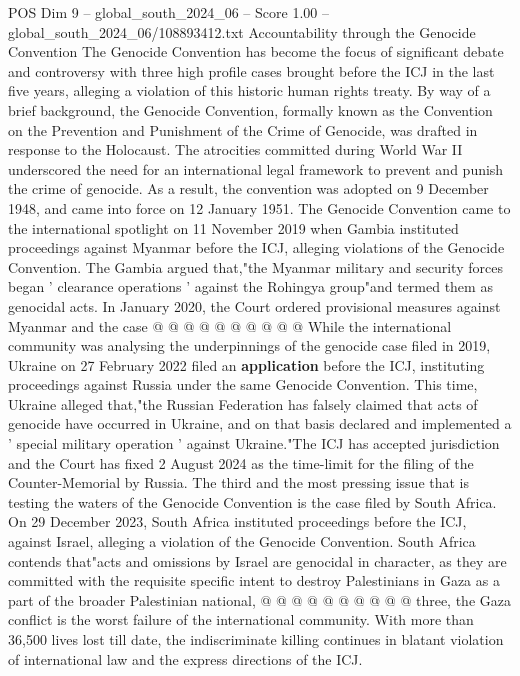\begin{textsample}{POS Dim 9 – global\_south\_2024\_06 – Score 1.00 – global\_south\_2024\_06/108893412.txt}  \label{ex:f9_pos_090}
Accountability through the Genocide Convention The Genocide Convention has become the focus of significant debate and controversy with three high profile cases brought before the ICJ in the last five years, alleging a violation of this historic human rights treaty.
By way of a brief background, the Genocide Convention, formally known as the Convention on the Prevention and Punishment of the Crime of Genocide, was drafted in response to the Holocaust.
The atrocities committed during World War II underscored the need for an international legal framework to prevent and punish the crime of genocide.
As a result, the convention was adopted on 9 December 1948, and came into force on 12 January 1951.
The Genocide Convention came to the international spotlight on 11 November 2019 when Gambia instituted proceedings against Myanmar before the ICJ, alleging violations of the Genocide Convention.
The Gambia argued that,"the Myanmar military and security forces began ' clearance operations ' against the Rohingya group"and termed them as genocidal acts.
In January 2020, the Court ordered provisional measures against Myanmar and the case @ @ @ @ @ @ @ @ @ @ While the international community was analysing the underpinnings of the genocide case filed in 2019, Ukraine on 27 February 2022 filed an \textbf{application} before the ICJ, instituting proceedings against Russia under the same Genocide Convention.
This time, Ukraine alleged that,"the Russian Federation has falsely claimed that acts of genocide have occurred in Ukraine, and on that basis declared and implemented a ' special military operation ' against Ukraine."The ICJ has accepted jurisdiction and the Court has fixed 2 August 2024 as the time-limit for the filing of the Counter-Memorial by Russia.
The third and the most pressing issue that is testing the waters of the Genocide Convention is the case filed by South Africa.
On 29 December 2023, South Africa instituted proceedings before the ICJ, against Israel, alleging a violation of the Genocide Convention.
South Africa contends that"acts and omissions by Israel are genocidal in character, as they are committed with the requisite specific intent to destroy Palestinians in Gaza as a part of the broader Palestinian national, @ @ @ @ @ @ @ @ @ @ three, the Gaza conflict is the worst failure of the international community.
With more than 36,500 lives lost till date, the indiscriminate killing continues in blatant violation of international law and the express directions of the ICJ.

\end{textsample}
